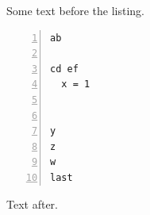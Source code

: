 \documentclass{article}
\begin{document}
Some text before the listing.
\begin{lstlisting}[numbers=left,stepnumber=3,numberblanklines=false,numberfirstline=true,numbersep=1em]
ab

cd ef
  x = 1


y
z
w
last

\end{lstlisting}
Text after.
\end{document}
